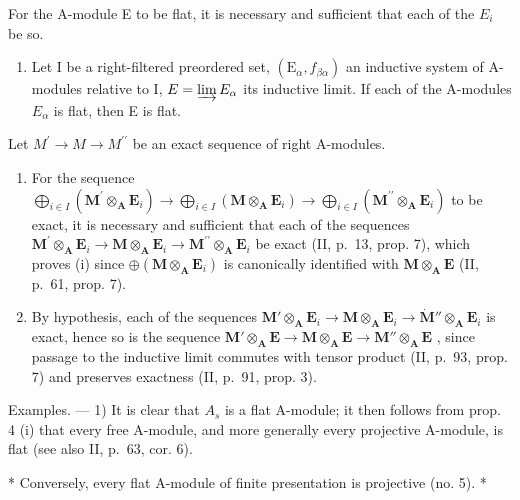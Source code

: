For the A-module E to be flat, it is necessary and sufficient that each of the \(E_{i}\) be so.

\begin{enumerate}
\def\labelenumi{(\roman{enumi})}
\setcounter{enumi}{1}
\tightlist
\item
  Let I be a right-filtered preordered set, \((\mathrm{E}_{\alpha}, f_{\beta\alpha})\) an inductive system of A-modules relative to I, \(E = \varinjlim E_{\alpha}\) its inductive limit. If each of the A-modules \(E_{\alpha}\) is flat, then E is flat.
\end{enumerate}

Let \(M^{\prime} \rightarrow M \rightarrow M^{\prime\prime}\) be an exact sequence of right A-modules.

\begin{enumerate}
\def\labelenumi{(\roman{enumi})}
\item
  For the sequence \(\bigoplus_{i\in I}(\mathbf{M}^{\prime}\otimes_{\mathbf{A}}\mathbf{E}_{i})\to \bigoplus_{i\in I}(\mathbf{M}\otimes_{\mathbf{A}}\mathbf{E}_{i})\to \bigoplus_{i\in I}(\mathbf{M}^{\prime \prime}\otimes_{\mathbf{A}}\mathbf{E}_{i})\) to be exact, it is necessary and sufficient that each of the sequences \(\mathbf{M}^{\prime}\otimes_{\mathbf{A}}\mathbf{E}_{i}\to \mathbf{M}\otimes_{\mathbf{A}}\mathbf{E}_{i}\to \mathbf{M}^{\prime \prime}\otimes_{\mathbf{A}}\mathbf{E}_{i}\) be exact (II, p.~13, prop. 7), which proves (i) since \(\oplus (\mathbf{M}\otimes_{\mathbf{A}}\mathbf{E}_{i})\) is canonically identified with \(\mathbf{M}\otimes_{\mathbf{A}}\mathbf{E}\) (II, p.~61, prop. 7).
\item
  By hypothesis, each of the sequences \(\mathbf{M}' \otimes_{\mathbf{A}} \mathbf{E}_i \to \mathbf{M} \otimes_{\mathbf{A}} \mathbf{E}_i \to \dot{\mathbf{M}}'' \otimes_{\mathbf{A}} \mathbf{E}_i\) is exact, hence so is the sequence \(\mathbf{M}' \otimes_{\mathbf{A}} \mathbf{E} \to \mathbf{M} \otimes_{\mathbf{A}} \mathbf{E} \to \mathbf{M}'' \otimes_{\mathbf{A}} \mathbf{E}\) , since passage to the inductive limit commutes with tensor product (II, p.~93, prop. 7) and preserves exactness (II, p.~91, prop. 3).
\end{enumerate}

Examples. --- 1) It is clear that \(A_{s}\) is a flat A-module; it then follows from prop. 4 (i) that every free A-module, and more generally every projective A-module, is flat (see also II, p.~63, cor. 6).

* Conversely, every flat A-module of finite presentation is projective (no. 5). *

